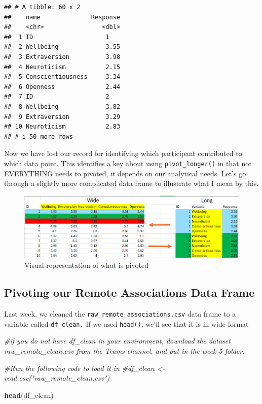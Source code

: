 \documentclass[
]{book}
\newenvironment{Shaded}{\begin{snugshade}}{\end{snugshade}}
\newcommand{\CommentTok}[1]{\textcolor[rgb]{0.56,0.35,0.01}{\textit{#1}}}
\newcommand{\FunctionTok}[1]{\textcolor[rgb]{0.13,0.29,0.53}{\textbf{#1}}}
\newcommand{\NormalTok}[1]{#1}
\begin{document}
\begin{verbatim}
## # A tibble: 60 x 2
##    name              Response
##    <chr>                <dbl>
##  1 ID                    1   
##  2 Wellbeing             3.55
##  3 Extraversion          3.98
##  4 Neuroticism           2.15
##  5 Conscientiousness     3.34
##  6 Openness              2.44
##  7 ID                    2   
##  8 Wellbeing             3.82
##  9 Extraversion          3.29
## 10 Neuroticism           2.83
## # i 50 more rows
\end{verbatim}

Now we have lost our record for identifying which participant contributed to which data point. This identifies a key about using \texttt{pivot\_longer()} in that not EVERYTHING needs to pivoted, it depends on our analytical needs. Let's go through a slightly more complicated data frame to illustrate what I mean by this.

\begin{figure}
\centering
\includegraphics{img/06-pivot-visualisation.png}
\caption{\label{fig:unnamed-chunk-226}Visual representation of what is pivoted}
\end{figure}

\hypertarget{pivoting-our-remote-associations-data-frame}{%
\subsection{Pivoting our Remote Associations Data Frame}\label{pivoting-our-remote-associations-data-frame}}

Last week, we cleaned the \texttt{raw\_remote\_associations.csv} data frame to a variable called \texttt{df\_clean.} If we used \texttt{head()}, we'll see that it is in wide format

\begin{Shaded}
\begin{Highlighting}[]
\CommentTok{\#if you do not have df\_clean in your environment, download the dataset \textasciigrave{}raw\_remote\_clean.csv\textasciigrave{} from the Teams channel, and put in the week 5 folder. }

\CommentTok{\#Run the following code to load it in }
\CommentTok{\#df\_clean \textless{}{-} read.csv("raw\_remote\_clean.csv") }

\FunctionTok{head}\NormalTok{(df\_clean)}
\end{Highlighting}
\end{Shaded}
\end{document}
